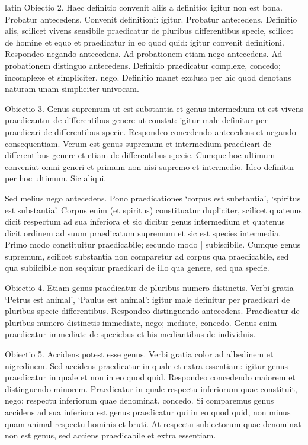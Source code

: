 \begin{otherlanguage*}{latin}
\pstart
  Obiectio 2. Haec definitio convenit aliis a definitio: igitur non est bona. Probatur antecedens. Convenit definitioni: igitur. Probatur antecedens. Definitio alis, scilicet vivens sensibile praedicatur de pluribus differentibus specie, scilicet de homine et equo et praedicatur in eo quod quid: igitur convenit definitioni. Respondeo negando antecedens. Ad probationem etiam nego antecedens. Ad probationem distinguo antecedens. Definitio praedicatur complexe, concedo; incomplexe et simpliciter, nego. Definitio manet exclusa per hic quod denotans naturam unam simpliciter univocam. 
\pend

\pstart
  Obiectio 3. Genus supremum ut est substantia et genus intermedium ut est vivens praedicantur de differentibus genere ut constat: igitur male definitur per praedicari de differentibus specie. Respondeo concedendo antecedens et negando consequentiam. Verum est genus supremum et intermedium praedicari de differentibus genere et etiam de differentibus specie. Cumque hoc ultimum conveniat omni generi et primum non nisi supremo et intermedio. Ideo definitur per hoc ultimum. Sic aliqui. 
\pend

\pstart
  Sed melius nego antecedens. Pono praedicationes `corpus est substantia', `spiritus est substantia'. Corpus enim (et spiritus) constituatur dupliciter, scilicet quatenus dicit respectum ad sua inferiora et sic dicitur genus intermedium et quatenus dicit ordinem ad suum praedicatum supremum et sic est species intermedia. Primo modo constituitur praedicabile; secundo modo \textnormal{|} subiscibile. Cumque genus supremum, scilicet substantia non comparetur ad corpus qua praedicabile, sed qua subiicibile non sequitur praedicari de illo qua genere, sed qua specie. 
\pend

\pstart
  Obiectio 4. Etiam genus praedicatur de pluribus numero distinctis. Verbi gratia `Petrus est animal', `Paulus est animal': igitur male definitur per praedicari de pluribus specie differentibus. Respondeo distinguendo antecedens. Praedicatur de pluribus numero distinctis immediate, nego; mediate, concedo. Genus enim praedicatur immediate de speciebus et his mediantibus de individuis. 
\pend

\pstart
  Obiectio 5. Accidens potest esse genus. Verbi gratia color ad albedinem et nigredinem. Sed accidens praedicatur in quale et extra essentiam: igitur genus praedicatur in quale et non in eo quod quid. Respondeo concedendo maiorem et distinguendo minorem. Praedicatur in quale respectu inferiorum quae constituit, nego; respectu inferiorum quae denominat, concedo. Si comparemus genus accidens ad sua inferiora est genus praedicatur qui in eo quod quid, non minus quam animal respectu hominis et bruti. At respectu subiectorum quae denominat non est genus, sed acciens praedicabile et extra essentiam. 
\pend


\end{otherlanguage*}
